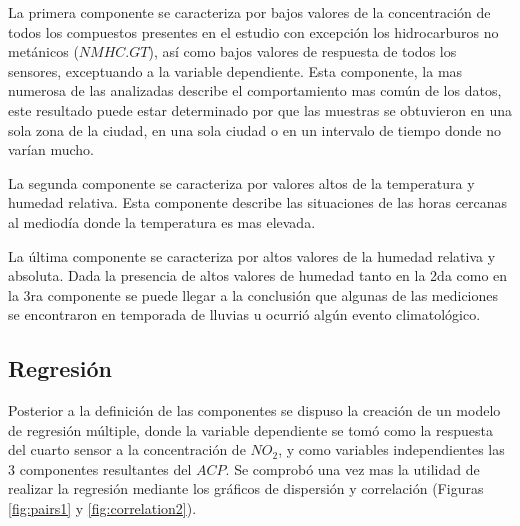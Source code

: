 \documentclass[a4paper,10pt,twocolumn]{article}
\begin{document}
  La primera componente se caracteriza por bajos valores de la concentración de todos los compuestos presentes en el estudio con excepción los hidrocarburos no metánicos ($NMHC.GT$), así como bajos valores de respuesta de todos los sensores, exceptuando a la variable dependiente. Esta componente, la mas numerosa de las analizadas describe el comportamiento mas común de los datos, este resultado puede estar determinado por que las muestras se obtuvieron en una sola zona de la ciudad, en una sola ciudad o en un intervalo de tiempo donde no varían mucho.
  
  La segunda componente se caracteriza por valores altos de la temperatura y humedad relativa. Esta componente describe las situaciones de las horas cercanas al mediodía donde la temperatura es mas elevada.
  
  La última componente se caracteriza por altos valores de la humedad relativa y absoluta. Dada la presencia de altos valores de humedad tanto en la 2da como en la 3ra componente se puede llegar a la conclusión que algunas de las mediciones se encontraron en temporada de lluvias u ocurrió algún evento climatológico.
  
  \subsection{Regresión} 
  
  Posterior a la definición de las componentes se dispuso la creación de un modelo de regresión múltiple, donde la variable dependiente se tomó como la respuesta del cuarto sensor a la concentración de $NO_2$, y como variables independientes las 3 componentes resultantes del $ACP$. Se comprobó una vez mas la utilidad de realizar la regresión mediante los gráficos de dispersión y correlación (Figuras \ref{fig:pairs1} y \ref{fig:correlation2}).
  
\end{document}
